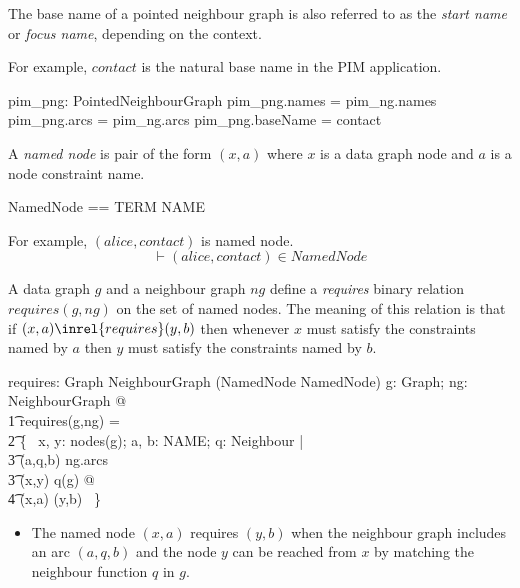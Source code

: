 \documentclass{article}
\begin{document}
The base name of a pointed neighbour graph is also referred to as the {\em start name} or {\em focus name}, depending on the context.

For example, $contact$ is the natural base name in the PIM application.
\begin{axdef}
	pim\_png: PointedNeighbourGraph
\where
	pim\_png.names = pim\_ng.names
\also
	pim\_png.arcs = pim\_ng.arcs
\also
	pim\_png.baseName = contact
\end{axdef}

A {\em named node} is pair of the form $(x,a)$ where $x$ is a data graph node and $a$ is a node constraint name.
\begin{zed}
NamedNode == TERM \cross NAME
\end{zed}

For example, $(alice, contact)$ is named node.
\[\vdash
	(alice,contact) \in NamedNode
\]

A data graph $g$ and a neighbour graph $ng$ define a {\em requires} binary relation $requires(g,ng)$ on the set of named nodes.
The meaning of this relation is that if $(x,a) \inrel{requires} (y,b)$ then whenever $x$ must satisfy the constraints named by $a$ then
$y$ must satisfy the constraints named by $b$.
\begin{axdef}
requires: Graph \cross NeighbourGraph \fun (NamedNode \rel NamedNode)
\where
\forall g: Graph; ng: NeighbourGraph @ \\
\t1 requires(g,ng) = \\
\t2		\{~ x, y: nodes(g); a, b: NAME; q: Neighbour | \\
\t3			(a,q,b) \in ng.arcs \land \\
\t3			(x,y) \in q(g) @ \\
\t4				(x,a) \mapsto (y,b) ~\}
\end{axdef}
\begin{itemize}
\item The named node $(x,a)$ requires $(y,b)$ when the neighbour graph includes an arc $(a,q,b)$ and the node $y$ can be
reached from $x$ by matching the neighbour function $q$ in $g$.
\end{itemize}
\end{document}
